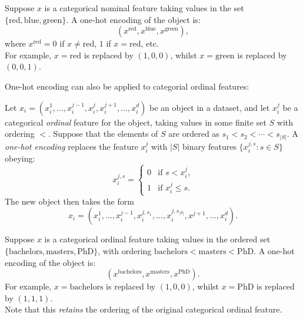 \begin{frameex}
Suppose $x$ is a categorical nominal feature taking values in the set $\{\text{red}, \text{blue}, \text{green}\}$. A one-hot encoding of the object is:
\begin{equation*}
(x^{\text{red}}, x^{\text{blue}}, x^{\text{green}}),
\end{equation*}
where $x^{\text{red}} = 0$ if $x \neq \text{red}$, $1$ if $x = \text{red}$, etc.\\

For example, $x = \text{red}$ is replaced by $(1,0,0)$, whilst $x = \text{green}$ is replaced by $(0,0,1)$. 
\end{frameex}

One-hot encoding can also be applied to categorial ordinal features:

\begin{framedef}
Let $x_i = (x_i^1,...,x_i^{j-1},x_i^j,x_i^{j+1}, ..., x_i^d)$ be an object in a dataset, and let $x_i^j$ be a categorical \textit{ordinal} feature for the object, taking values in some finite set $S$ with ordering $<$. Suppose that the elements of $S$ are ordered as $s_1 < s_2 < \cdots < s_{|S|}$. A \textit{one-hot encoding} replaces the feature $x_i^j$ with $|S|$ binary features $\{x_i^{j,s} : s \in S\}$ obeying:
\begin{equation*}
x_i^{j,s} = \begin{cases} 0 & \text{if $s < x_i^j$,}\\ 1 & \text{if $x_i^j \leq s$.} \end{cases}
\end{equation*}
The new object then takes the form 
\begin{equation*}
x_i = (x_i^1,...,x_i^{j-1}, x_i^{j,s_1},...,x_i^{j, s_{|S|}}, x^{j+1},...,x_i^d).
\end{equation*}
\end{framedef}

\begin{frameex}
Suppose $x$ is a categorical ordinal feature taking values in the ordered set $\{\text{bachelors}, \text{masters}, \text{PhD}\}$, with ordering $\text{bachelors} < \text{masters} < \text{PhD}$. A one-hot encoding of the object is:
\begin{equation*}
(x^{\text{bachelors}}, x^{\text{masters}}, x^{\text{PhD}}).
\end{equation*}
For example, $x = \text{bachelors}$ is replaced by $(1,0,0)$, whilst $x = \text{PhD}$ is replaced by $(1,1,1)$. \\

Note that this \textit{retains} the ordering of the original categorical ordinal feature.
\end{frameex}





